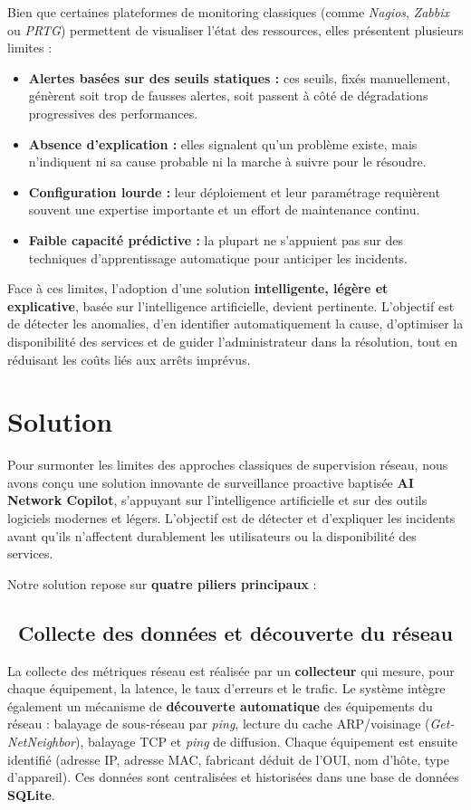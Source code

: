 \documentclass[12pt,a4paper]{report}
\newcommand{\diamonditem}{\ding{117}}   %
\begin{document}
Bien que certaines plateformes de monitoring classiques (comme \textit{Nagios},
\textit{Zabbix} ou \textit{PRTG}) permettent de visualiser l'état des ressources,
elles présentent plusieurs limites :
\begin{itemize}[leftmargin=*]
\item \textbf{Alertes basées sur des seuils statiques :} ces seuils, fixés
manuellement, génèrent soit trop de fausses alertes, soit passent à côté de
dégradations progressives des performances.
\item \textbf{Absence d'explication :} elles signalent qu'un problème existe, mais
n'indiquent ni sa cause probable ni la marche à suivre pour le résoudre.
\item \textbf{Configuration lourde :} leur déploiement et leur paramétrage
requièrent souvent une expertise importante et un effort de maintenance continu.
\item \textbf{Faible capacité prédictive :} la plupart ne s'appuient pas sur des
techniques d'apprentissage automatique pour anticiper les incidents.
\end{itemize}

Face à ces limites, l'adoption d'une solution \textbf{intelligente, légère et
explicative}, basée sur l'intelligence artificielle, devient pertinente.
L'objectif est de détecter les anomalies, d'en identifier automatiquement la
cause, d'optimiser la disponibilité des services et de guider l'administrateur
dans la résolution, tout en réduisant les coûts liés aux arrêts imprévus.

\section{Solution}
Pour surmonter les limites des approches classiques de supervision réseau, nous
avons conçu une solution innovante de surveillance proactive baptisée
\textbf{AI Network Copilot}, s'appuyant sur l'intelligence artificielle et sur des
outils logiciels modernes et légers. L'objectif est de détecter et d'expliquer les
incidents avant qu'ils n'affectent durablement les utilisateurs ou la
disponibilité des services.

Notre solution repose sur \textbf{quatre piliers principaux} :

\subsection*{\diamonditem\ Collecte des données et découverte du réseau}
La collecte des métriques réseau est réalisée par un \textbf{collecteur} qui
mesure, pour chaque équipement, la latence, le taux d'erreurs et le trafic. Le
système intègre également un mécanisme de \textbf{découverte automatique} des
équipements du réseau : balayage de sous-réseau par \textit{ping}, lecture du
cache ARP/voisinage (\textit{Get-NetNeighbor}), balayage TCP et \textit{ping} de
diffusion. Chaque équipement est ensuite identifié (adresse IP, adresse MAC,
fabricant déduit de l'OUI, nom d'hôte, type d'appareil). Ces données sont
centralisées et historisées dans une base de données \textbf{SQLite}.
\end{document}
